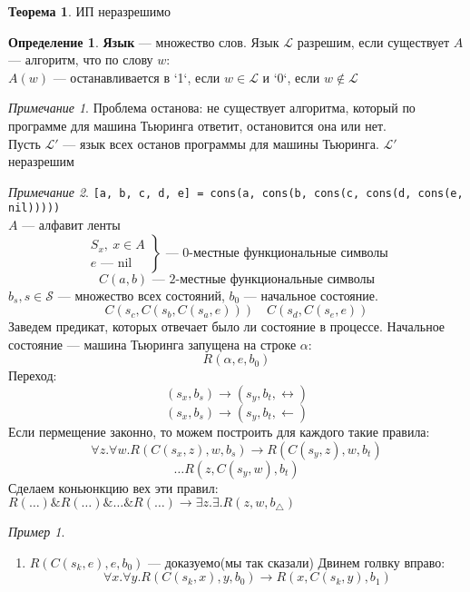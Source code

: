 \documentclass[oneside]{book}
\newcommand{\fixme}{{\color{red}\fbox{\text{Исправить}}}}
\theoremstyle{plain}
\theoremstyle{remark}
\newtheorem*{remark}{Примечание}
\newtheorem*{examp}{Пример}
\theoremstyle{definition}
\newtheorem{theorem}{Теорема}[section]
\newtheorem*{definition}{Определение}
\begin{document}
\begin{theorem}
ИП неразрешимо
\label{org290b04f}
\end{theorem}
\begin{definition}
\textbf{Язык} --- множество слов. Язык \(\mathcal{L}\) разрешим, если существует \(A\) --- алгоритм, что по слову \(w\): \\
\(A(w)\) --- останавливается в `1`, если \(w \in \mathcal{L}\) и `0`, если \(w \not\in \mathcal{L}\)
\label{org84fda2f}
\end{definition}
\begin{remark}
Проблема останова: не существует алгоритма, который по программе для машина Тьюринга ответит, остановится она или нет. \\
Пусть \(\mathcal{L}'\) --- язык всех останов программы для машины Тьюринга. \(\mathcal{L}'\) неразрешим
\end{remark}
\begin{remark}
\texttt{[a, b, c, d, e] = cons(a, cons(b, cons(c, cons(d, cons(e, nil)))))} \\
\(A\) --- алфавит ленты
\[ \left.\begin{array}{l}
S_x,\ x \in A \\
e \text{ --- } \text{nil}
\end{array}\right\} \text{ --- } 0\text{-местные функциональные символы}\]
\[ C(a, b) \text{ --- } 2\text{-местные функциональные символы} \]
\(b_s, s \in \mathcal{S}\) --- множество всех состояний, \(b_0\) --- начальное состояние.
\[ C(s_c, C(s_b, C(s_a, e))) \quad C(s_d, C(s_e, e)) \]
Заведем предикат, которых отвечает было ли состояние в процессе. Начальное состояние --- машина Тьюринга запущена на строке \(\alpha\):
\[ R(\alpha, e, b_0) \]
Переход:
\[ (s_x, b_s) \to (s_y, b_t, \leftrightarrow) \]
\[ (s_x, b_s) \to (s_y, b_t, \leftarrow) \]
Если пермещение законно, то можем построить для каждого такие правила:
\[ \forall z. \forall w. R(C(s_x, z), w, b_s) \to R(C(s_y, z), w, b_t) \]
\[ \dots  R(z, C(s_y, w), b_t)\]
Сделаем коньюнкцию вех эти правил: \(R(\dots)\&R(\dots)\&\dots\&R(\dots) \to \exists z. \exists . R(z, w, b_\triangle)\)
\fixme
\end{remark}
\begin{examp}
\-
\begin{enumerate}
\item \(R(C(s_k, e), e, b_0)\) --- доказуемо(мы так сказали)
Двинем голвку вправо:
\[ \forall x. \forall y. R(C(s_k, x), y, b_0) \to R(x, C(s_k, y), b_1) \]
\end{enumerate}
\end{examp}
\end{document}
